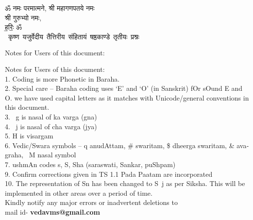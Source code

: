 \begin{titlepage}
    \begin{center}
 
\begin{sanskrit}
    { \Large
    ॐ नमः परमात्मने, श्री महागणपतये नमः\\ 
    श्री गुरुभ्यो नमः,\\
     ह॒रिः॒ ॐ 
    }
    \\
    \vspace{2.5cm}
    \mbox{ \Large
    कृष्ण यजुर्वेदीय तैत्तिरीय संहितायं षष्ठकाण्डे तृतीयः प्रश्नः 
    }
    
\end{sanskrit}
\end{center}

\end{titlepage}

\pagebreak

\begin{english}
    
    
    {
    
        Notes for Users of this document:\newline%
    
        Notes for Users of this document: \\
        1. Coding is more Phonetic in Baraha. \\
        2. Special care – Baraha coding uses ‘E’ and ‘O’ (in Sanskrit) fOr sOund E and O. we have used capital letters as it matches with Unicode/general conventions in this document. \\
        3. ~g is nasal of ka varga (gna) \\
        4. ~j is nasal of cha varga (jya) \\
        5. H is visargam \\
        6.  Vedic/Swara symbols – q anudAttam, \# swaritam, \$ dheerga swaritam, \& avagraha,  ~M nasal symbol \\
        7.  ushmAn codes s, S, Sha (saraswati, Sankar, puShpam) \\
        9. Confirm corrections given in TS 1.1 Pada Paatam are incorporated \\
        10. The representation of Sn has been changed to S~j as per Siksha. This will be implemented in other areas over a period of time. \\
    
    Kindly notify any major errors or inadvertent deletions to \\
    mail id- \textbf{vedavms@gmail.com}
    }
    \end{english}\par
\pagebreak

\tableofcontents

\pagebreak


